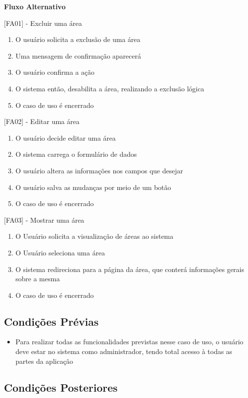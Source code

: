 \begin{apendicesenv}
\textbf{Fluxo Alternativo}

[FA01] - Excluir uma área
\begin{enumerate}
  \item{O usuário solicita a exclusão de uma área}
  \item{Uma mensagem de confirmação aparecerá}
  \item{O usuário confirma a ação}
  \item{O sistema então, desabilita a área, realizando a exclusão lógica}
  \item{O caso de uso é encerrado}
\end{enumerate}


[FA02] - Editar uma área
\begin{enumerate}
  \item{O usuário decide editar uma área}
  \item{O sistema carrega o formulário de dados}
  \item{O usuário altera as informações nos campos que desejar}
  \item{O usuário salva as mudanças por meio de um botão}
  \item{O caso de uso é encerrado}
\end{enumerate}


[FA03] - Mostrar uma área
\begin{enumerate}
  \item{O Usuário solicita a visualização de áreas ao sistema}
  \item{O Usuário seleciona uma área}
  \item{O sistema redireciona para a página da área, que conterá informações gerais sobre a mesma}
  \item{O caso de uso é encerrado}
\end{enumerate}

\subsection{Condições Prévias}

\begin{itemize}
\item{Para realizar todas as funcionalidades previstas nesse caso de uso, o usuário deve estar no sistema como administrador, tendo total acesso à todas as partes da aplicação}
\end{itemize}

\subsection{Condições Posteriores}


\end{apendicesenv}
